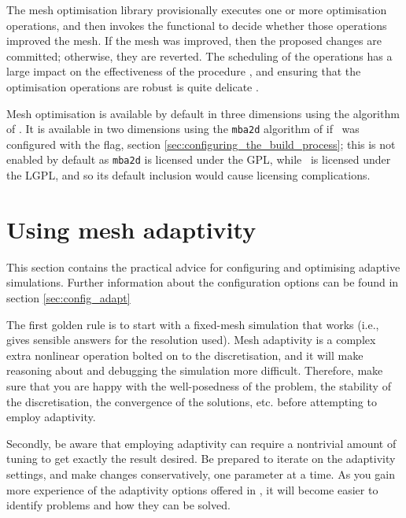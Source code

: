 The mesh optimisation library provisionally executes one or more optimisation operations, and then
invokes the functional to decide whether those operations improved the mesh. If the
mesh was improved, then the proposed changes are committed; otherwise, they are reverted. The
scheduling of the operations has a large impact on the effectiveness of the procedure \citep{li2005},
and ensuring that the optimisation operations are robust is quite delicate \citep{compere2010a}.

Mesh optimisation is available by default in three dimensions using the algorithm
of \citet{pain2001}. It is available in two dimensions using the \texttt{mba2d} algorithm of
\citet{vasilevskii1999} if \fluidity\ was configured with
the  flag, section \ref{sec:configuring_the_build_process}; this is not enabled by default
as \texttt{mba2d} is licensed under the GPL, while \fluidity\ is licensed under the LGPL,
and so its default inclusion would cause licensing complications.

\section{Using mesh adaptivity} \label{sec:using_mesh_adaptivity}
This section contains the practical advice for configuring and optimising
adaptive simulations. Further information about the configuration options can be found in section \ref{sec:config_adapt}

The first golden rule is to start with a fixed-mesh simulation that works
(i.e., gives sensible answers for the resolution used). Mesh adaptivity is a complex
extra nonlinear operation bolted on to the discretisation, and it will make reasoning
about and debugging the simulation more difficult. Therefore, make sure that you
are happy with the well-posedness of the problem, the stability of the discretisation,
the convergence of the solutions, etc. before attempting to employ adaptivity.

Secondly, be aware that employing adaptivity can require a nontrivial amount of tuning
to get exactly the result desired. Be prepared to iterate on the adaptivity settings,
and make changes conservatively, one parameter at a time. As you gain more experience
of the adaptivity options offered in \fluidity, it will become easier to identify
problems and how they can be solved.


